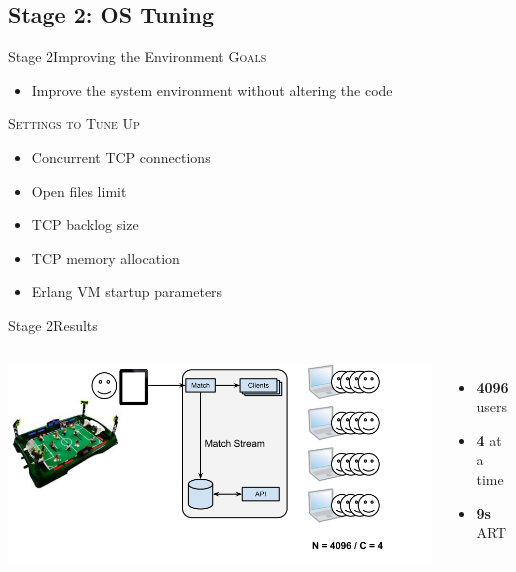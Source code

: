 \documentclass[utf8]{beamer}
\begin{document}
\subsection{Stage 2: OS Tuning}
\begin{frame}{Stage 2}{Improving the Environment}
	\textsc{Goals}
	\begin{itemize}
		\item Improve the system environment without altering the code
	\end{itemize}
	\pause
	\textsc{Settings to Tune Up}
	\begin{itemize}
		\item<+-> Concurrent TCP connections
		\item<+-> Open files limit
		\item<+-> TCP backlog size
		\item<+-> TCP memory allocation
		\item<+-> Erlang VM startup parameters
	\end{itemize}
\end{frame}
\begin{frame}{Stage 2}{Results}
	\begin{columns}
			\includegraphics[top=-1,width=\textwidth]{img/MatchStream-2.png}
			\begin{itemize}
				\item \textbf{\Large 4096} users
				\item \textbf{\Large 4} at a time
				\item \textbf{\Large 9s} ART
			\end{itemize}
	\end{columns}
\end{frame}
\end{document}
